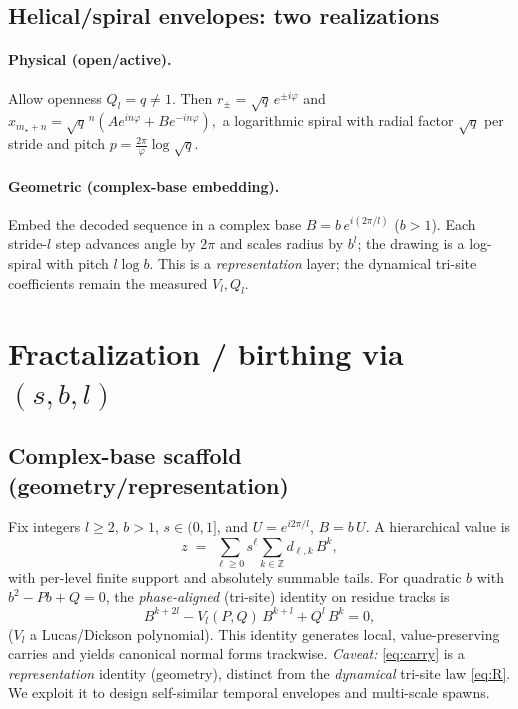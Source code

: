 \documentclass[11pt]{article}
\theoremstyle{definition}
\theoremstyle{remark}
\newcommand{\Z}{\mathbb{Z}}
\begin{document}
\subsection{Helical/spiral envelopes: two realizations}
\paragraph{Physical (open/active).}
Allow openness $Q_l=q\neq 1$. Then $r_\pm=\sqrt{q}\,e^{\pm i\varphi}$ and
\(
x_{m_\star+n}=\sqrt{q}^{\,n}(A e^{in\varphi}+B e^{-in\varphi}),
\)
a logarithmic spiral with radial factor $\sqrt{q}$ per stride and pitch $p=\frac{2\pi}{\varphi}\log\sqrt{q}$.

\paragraph{Geometric (complex-base embedding).}
Embed the decoded sequence in a complex base $B=b\,e^{i(2\pi/l)}$ ($b>1$). Each stride-$l$ step advances angle by $2\pi$ and scales radius by $b^l$; the drawing is a log-spiral with pitch $l\log b$. This is a \emph{representation} layer; the dynamical tri-site coefficients remain the measured $V_l,Q_l$.

\section{Fractalization / birthing via $(s,b,l)$}\label{sec:fractal}
\subsection{Complex-base scaffold (geometry/representation)}
Fix integers $l\ge 2$, $b>1$, $s\in(0,1]$, and $U=e^{i2\pi/l}$, $B=b\,U$. A hierarchical value is
\begin{equation}
z\;=\;\sum_{\ell\ge 0} s^\ell \sum_{k\in\Z} d_{\ell,k}\,B^{k},
\end{equation}
with per-level finite support and absolutely summable tails. For quadratic $b$ with $b^2-Pb+Q=0$, the \emph{phase-aligned} (tri-site) identity on residue tracks is
\begin{equation}\label{eq:carry}
B^{k+2l}-V_l(P,Q)\,B^{k+l}+Q^{l}\,B^{k}=0,
\end{equation}
($V_l$ a Lucas/Dickson polynomial). This identity generates local, value-preserving carries and yields canonical normal forms trackwise. \emph{Caveat:} \eqref{eq:carry} is a \emph{representation} identity (geometry), distinct from the \emph{dynamical} tri-site law \eqref{eq:R}. We exploit it to design self-similar temporal envelopes and multi-scale spawns.
\end{document}
